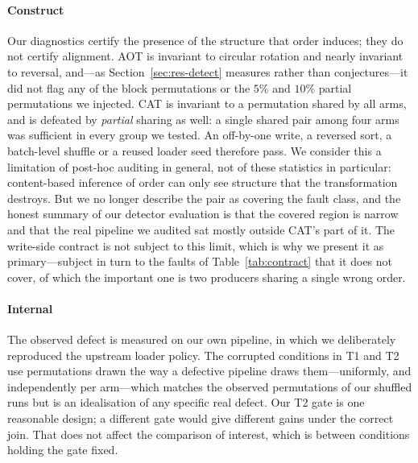 \documentclass[a4paper,fleqn]{cas-sc}
\begin{document}
\paragraph{Construct}
Our diagnostics certify the presence of the structure that order induces; they do
not
certify alignment. AOT is invariant to circular rotation and nearly invariant to
reversal, and---as Section~\ref{sec:res-detect} measures rather than
conjectures---it did not flag any of the block permutations or the $5\%$ and $10\%$
partial permutations we injected. CAT is invariant to a permutation shared by all
arms, and is defeated by \emph{partial} sharing as well: a single shared pair among
four arms was sufficient in every group we tested. An off-by-one
write, a reversed sort, a batch-level shuffle or a reused loader seed therefore
pass. We consider
this a limitation of post-hoc auditing in general, not of these statistics in
particular: content-based inference of order can only see structure that the
transformation destroys. But we no longer describe the pair as covering the fault
class, and the honest summary of our detector evaluation is that the covered region
is narrow and that the real pipeline we audited sat mostly outside CAT's part of it.
The write-side contract is not subject to this limit,
which is why we present it as primary---subject in turn to the
\NumContractUndetected{} faults of Table~\ref{tab:contract} that it does not cover,
of which the important one is two producers sharing a single wrong order.

\paragraph{Internal}
The observed defect is measured on our own pipeline, in which we deliberately
reproduced the upstream loader policy. The corrupted conditions in T1 and T2 use
permutations drawn the way a defective pipeline draws them---uniformly, and
independently per arm---which matches the observed permutations of our shuffled
runs but is an idealisation of any specific real defect. Our T2 gate is one
reasonable design; a different gate would give different gains under the correct
join. That does not affect the comparison of interest, which is between conditions
holding the gate fixed.
\end{document}
